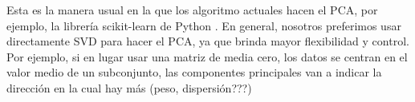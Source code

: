 Esta es la manera usual en la que los algoritmo actuales hacen el PCA, por ejemplo, la librería scikit-learn de Python \cite{scikit-learn}. En general, nosotros preferimos usar directamente SVD para hacer el PCA, ya que brinda mayor flexibilidad y control. Por ejemplo, si en lugar usar una matriz de media cero, los datos se centran en el valor medio de un subconjunto, las componentes principales van a indicar la dirección en la cual hay más \alert{(peso, dispersión???)}








